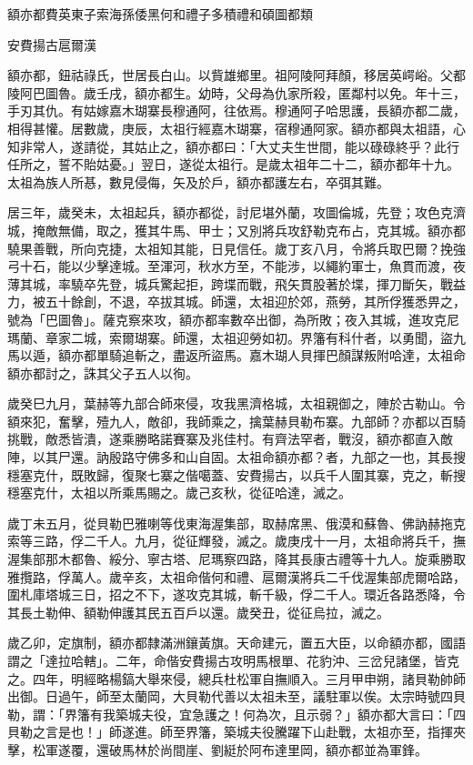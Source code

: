
\begin{pinyinscope}
額亦都費英東子索海孫倭黑何和禮子多積禮和碩圖都類

安費揚古扈爾漢

額亦都，鈕祜祿氏，世居長白山。以貲雄鄉里。祖阿陵阿拜顏，移居英崿峪。父都陵阿巴圖魯。歲壬戌，額亦都生。幼時，父母為仇家所殺，匿鄰村以免。年十三，手刃其仇。有姑嫁嘉木瑚寨長穆通阿，往依焉。穆通阿子哈思護，長額亦都二歲，相得甚懽。居數歲，庚辰，太祖行經嘉木瑚寨，宿穆通阿家。額亦都與太祖語，心知非常人，遂請從，其姑止之，額亦都曰：「大丈夫生世間，能以碌碌終乎？此行任所之，誓不貽姑憂。」翌日，遂從太祖行。是歲太祖年二十二，額亦都年十九。太祖為族人所惎，數見侵侮，矢及於戶，額亦都護左右，卒弭其難。

居三年，歲癸未，太祖起兵，額亦都從，討尼堪外蘭，攻圖倫城，先登；攻色克濟城，掩敵無備，取之，獲其牛馬、甲士；又別將兵攻舒勒克布占，克其城。額亦都驍果善戰，所向克捷，太祖知其能，日見信任。歲丁亥八月，令將兵取巴爾？挽強弓十石，能以少擊達城。至渾河，秋水方至，不能涉，以繩約軍士，魚貫而渡，夜薄其城，率驍卒先登，城兵驚起拒，跨堞而戰，飛矢貫股著於堞，揮刀斷矢，戰益力，被五十餘創，不退，卒拔其城。師還，太祖迎於郊，燕勞，其所俘獲悉畀之，號為「巴圖魯」。薩克察來攻，額亦都率數卒出御，為所敗；夜入其城，進攻克尼瑪蘭、章家二城，索爾瑚寨。師還，太祖迎勞如初。界籓有科什者，以勇聞，盜九馬以遁，額亦都單騎追斬之，盡返所盜馬。嘉木瑚人貝揮巴顏謀叛附哈達，太祖命額亦都討之，誅其父子五人以徇。

歲癸巳九月，葉赫等九部合師來侵，攻我黑濟格城，太祖親御之，陣於古勒山。令額來犯，奮擊，殪九人，敵卻，我師乘之，擒葉赫貝勒布寨。九部師？亦都以百騎挑戰，敵悉皆潰，遂乘勝略諾賽寨及兆佳村。有齊法罕者，戰沒，額亦都直入敵陣，以其尸還。訥殷路守佛多和山自固。太祖命額亦都？者，九部之一也，其長搜穩塞克什，既敗歸，復聚七寨之偕噶蓋、安費揚古，以兵千人圍其寨，克之，斬搜穩塞克什，太祖以所乘馬賜之。歲己亥秋，從征哈達，滅之。

歲丁未五月，從貝勒巴雅喇等伐東海渥集部，取赫席黑、俄漠和蘇魯、佛訥赫拖克索等三路，俘二千人。九月，從征輝發，滅之。歲庚戌十一月，太祖命將兵千，撫渥集部那木都魯、綏分、寧古塔、尼瑪察四路，降其長康古禮等十九人。旋乘勝取雅攬路，俘萬人。歲辛亥，太祖命偕何和禮、扈爾漢將兵二千伐渥集部虎爾哈路，圍札庫塔城三日，招之不下，遂攻克其城，斬千級，俘二千人。環近各路悉降，令其長土勒伸、額勒伸護其民五百戶以還。歲癸丑，從征烏拉，滅之。

歲乙卯，定旗制，額亦都隸滿洲鑲黃旗。天命建元，置五大臣，以命額亦都，國語謂之「達拉哈轄」。二年，命偕安費揚古攻明馬根單、花豹沖、三岔兒諸堡，皆克之。四年，明經略楊鎬大舉來侵，總兵杜松軍自撫順入。三月甲申朔，諸貝勒帥師出御。日過午，師至太蘭岡，大貝勒代善以太祖未至，議駐軍以俟。太宗時號四貝勒，謂：「界籓有我築城夫役，宜急護之！何為次，且示弱？」額亦都大言曰：「四貝勒之言是也！」師遂進。師至界籓，築城夫役騰躍下山赴戰，太祖亦至，指揮夾擊，松軍遂覆，還破馬林於尚間崖、劉綎於阿布達里岡，額亦都並為軍鋒。


\end{pinyinscope}

